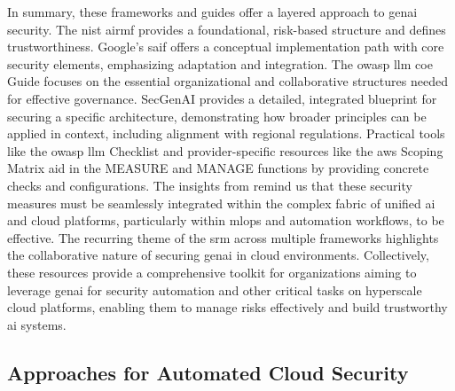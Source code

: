 In summary, these frameworks and guides offer a layered approach to \gls{genai} security. The \gls{nist} \gls{airmf} provides a foundational, risk-based structure and defines trustworthiness. Google's \gls{saif} offers a conceptual implementation path with core security elements, emphasizing adaptation and integration. The \gls{owasp} \gls{llm} \gls{coe} Guide focuses on the essential organizational and collaborative structures needed for effective governance. SecGenAI provides a detailed, integrated blueprint for securing a specific architecture, demonstrating how broader principles can be applied in context, including alignment with regional regulations. Practical tools like the \gls{owasp} \gls{llm} Checklist and provider-specific resources like the \gls{aws} Scoping Matrix aid in the MEASURE and MANAGE functions by providing concrete checks and configurations. The insights from \cite{sushil_prabhu_prabhakaran_integration_2024} remind us that these security measures must be seamlessly integrated within the complex fabric of unified \gls{ai} and cloud platforms, particularly within \gls{mlops} and automation workflows, to be effective. The recurring theme of the \gls{srm} across multiple frameworks \cite{tabassi_artificial_2023, hansen_introducing_2023, haryanto_secgenai_2024, editor_llm_nodate} highlights the collaborative nature of securing \gls{genai} in cloud environments. Collectively, these resources provide a comprehensive toolkit for organizations aiming to leverage \gls{genai} for security automation and other critical tasks on hyperscale cloud platforms, enabling them to manage risks effectively and build trustworthy \gls{ai} systems.

\subsection{Approaches for Automated Cloud Security} %
\label{sec:Approaches for Automated Cloud Security}


